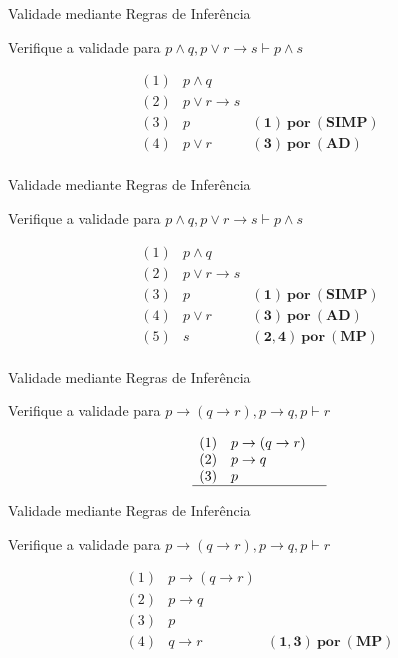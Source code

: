 \begin{frame}[t]{Validade mediante Regras de Inferência}

	Verifique a validade para $p \wedge q, p \vee r \rightarrow s \vdash p \wedge s$
	
	\vskip 1.5cm
	
	$$\begin{array}{lll}
	(1) & p \wedge q  & \\
	(2) & p \vee r \rightarrow s & \\
	\hline
	(3) & p & \mathbf{(1)~por~(SIMP)} \\
	(4) & p \vee r & \mathbf{(3)~por~(AD)} \\
	\end{array}$$	
\end{frame}

\begin{frame}[t]{Validade mediante Regras de Inferência}

	Verifique a validade para $p \wedge q, p \vee r \rightarrow s \vdash p \wedge s$
	
	\vskip 1.5cm
	
	$$\begin{array}{lll}
	(1) & p \wedge q  & \\
	(2) & p \vee r \rightarrow s & \\
	\hline
	(3) & p & \mathbf{(1)~por~(SIMP)} \\
	(4) & p \vee r & \mathbf{(3)~por~(AD)} \\
	(5) & s & \mathbf{(2,4)~por~(MP)} \\
	\end{array}$$	
\end{frame}


\begin{frame}[t]{Validade mediante Regras de Inferência}

	Verifique a validade para $p \rightarrow (q \rightarrow r), p \rightarrow q, p \vdash r$
	
	\vskip 1.5cm
	
	$$\begin{array}{lll}
	(1) & p \rightarrow (q \rightarrow r)  & \\
	(2) & p \rightarrow q & \\
	(3) & p & \\
	\hline
	\end{array}$$	
\end{frame}


\begin{frame}[t]{Validade mediante Regras de Inferência}

	Verifique a validade para $p \rightarrow (q \rightarrow r), p \rightarrow q, p \vdash r$
	
	\vskip 1.5cm
	
	$$\begin{array}{lll}
	(1) & p \rightarrow (q \rightarrow r)  & \\
	(2) & p \rightarrow q & \\
	(3) & p & \\
	\hline
	(4) & q \rightarrow r & \mathbf{(1,3) ~por~ (MP)}
	\end{array}$$	
\end{frame}


